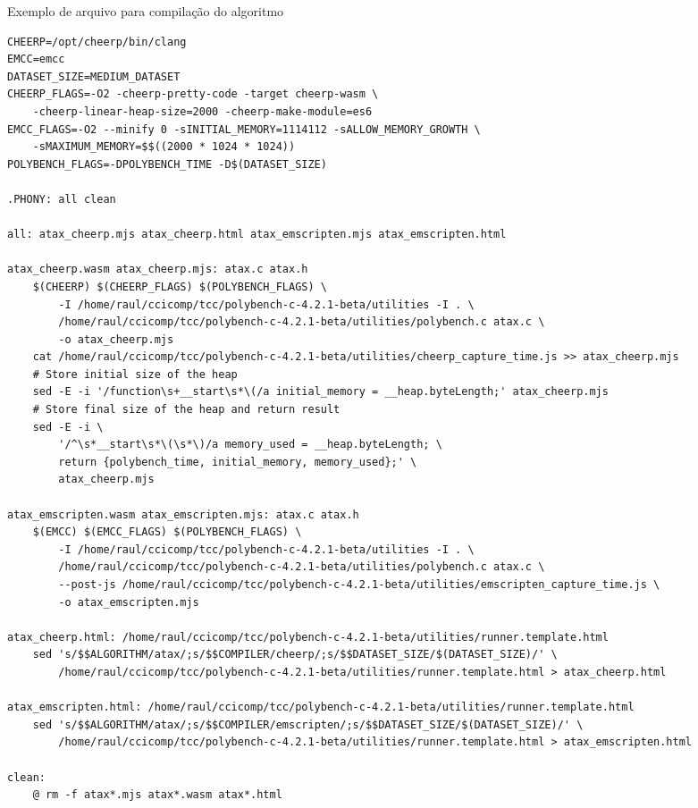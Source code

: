 \begin{quadro}
\caption{Exemplo de arquivo  para compilação do algoritmo \label{makefile_quadro}}
\begin{lstlisting}[tabsize=2, basicstyle=\ttfamily\tiny]
CHEERP=/opt/cheerp/bin/clang
EMCC=emcc
DATASET_SIZE=MEDIUM_DATASET
CHEERP_FLAGS=-O2 -cheerp-pretty-code -target cheerp-wasm \
	-cheerp-linear-heap-size=2000 -cheerp-make-module=es6
EMCC_FLAGS=-O2 --minify 0 -sINITIAL_MEMORY=1114112 -sALLOW_MEMORY_GROWTH \
	-sMAXIMUM_MEMORY=$$((2000 * 1024 * 1024))
POLYBENCH_FLAGS=-DPOLYBENCH_TIME -D$(DATASET_SIZE)

.PHONY: all clean

all: atax_cheerp.mjs atax_cheerp.html atax_emscripten.mjs atax_emscripten.html

atax_cheerp.wasm atax_cheerp.mjs: atax.c atax.h
	$(CHEERP) $(CHEERP_FLAGS) $(POLYBENCH_FLAGS) \
		-I /home/raul/ccicomp/tcc/polybench-c-4.2.1-beta/utilities -I . \
        /home/raul/ccicomp/tcc/polybench-c-4.2.1-beta/utilities/polybench.c atax.c \
		-o atax_cheerp.mjs
	cat /home/raul/ccicomp/tcc/polybench-c-4.2.1-beta/utilities/cheerp_capture_time.js >> atax_cheerp.mjs
	# Store initial size of the heap
	sed -E -i '/function\s+__start\s*\(/a initial_memory = __heap.byteLength;' atax_cheerp.mjs
	# Store final size of the heap and return result
	sed -E -i \
		'/^\s*__start\s*\(\s*\)/a memory_used = __heap.byteLength; \
		return {polybench_time, initial_memory, memory_used};' \
		atax_cheerp.mjs

atax_emscripten.wasm atax_emscripten.mjs: atax.c atax.h
	$(EMCC) $(EMCC_FLAGS) $(POLYBENCH_FLAGS) \
		-I /home/raul/ccicomp/tcc/polybench-c-4.2.1-beta/utilities -I . \
		/home/raul/ccicomp/tcc/polybench-c-4.2.1-beta/utilities/polybench.c atax.c \
		--post-js /home/raul/ccicomp/tcc/polybench-c-4.2.1-beta/utilities/emscripten_capture_time.js \
		-o atax_emscripten.mjs

atax_cheerp.html: /home/raul/ccicomp/tcc/polybench-c-4.2.1-beta/utilities/runner.template.html
	sed 's/$$ALGORITHM/atax/;s/$$COMPILER/cheerp/;s/$$DATASET_SIZE/$(DATASET_SIZE)/' \
		/home/raul/ccicomp/tcc/polybench-c-4.2.1-beta/utilities/runner.template.html > atax_cheerp.html

atax_emscripten.html: /home/raul/ccicomp/tcc/polybench-c-4.2.1-beta/utilities/runner.template.html
	sed 's/$$ALGORITHM/atax/;s/$$COMPILER/emscripten/;s/$$DATASET_SIZE/$(DATASET_SIZE)/' \
		/home/raul/ccicomp/tcc/polybench-c-4.2.1-beta/utilities/runner.template.html > atax_emscripten.html

clean:
	@ rm -f atax*.mjs atax*.wasm atax*.html
\end{lstlisting}
\end{quadro}

